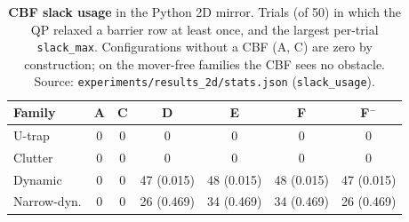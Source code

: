 \begin{table}[!htbp]
\centering
\caption{\textbf{CBF slack usage} in the Python 2D mirror. Trials (of 50) in which the QP relaxed a barrier row at least once, and the largest per-trial \texttt{slack\_max}. Configurations without a CBF (A, C) are zero by construction; on the mover-free families the CBF sees no obstacle. Source: \texttt{experiments/results\_2d/stats.json} (\texttt{slack\_usage}).}
\label{tab:slack}
\small
\begin{tabular}{lcccccc}
\toprule
Family & A & C & D & E & F & F$^{-}$ \\
\midrule
U-trap & 0 & 0 & 0 & 0 & 0 & 0 \\
Clutter & 0 & 0 & 0 & 0 & 0 & 0 \\
Dynamic & 0 & 0 & 47 (0.015) & 48 (0.015) & 48 (0.015) & 47 (0.015) \\
Narrow-dyn. & 0 & 0 & 26 (0.469) & 34 (0.469) & 34 (0.469) & 26 (0.469) \\
\bottomrule
\end{tabular}
\end{table}
